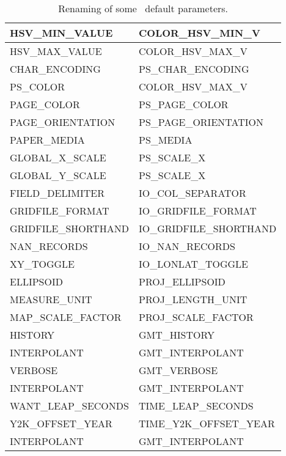 \begin{table}[H]
\begin{tabular}{|l|l|}
HSV\_MIN\_VALUE			&	COLOR\_HSV\_MIN\_V \\ \hline
HSV\_MAX\_VALUE			&	COLOR\_HSV\_MAX\_V \\ \hline
CHAR\_ENCODING			&	PS\_CHAR\_ENCODING \\ \hline
PS\_COLOR			&	COLOR\_HSV\_MAX\_V \\ \hline
PAGE\_COLOR			&	PS\_PAGE\_COLOR \\ \hline
PAGE\_ORIENTATION		&	PS\_PAGE\_ORIENTATION \\ \hline
PAPER\_MEDIA			&	PS\_MEDIA \\ \hline
GLOBAL\_X\_SCALE		&	PS\_SCALE\_X \\ \hline
GLOBAL\_Y\_SCALE		&	PS\_SCALE\_X \\ \hline
FIELD\_DELIMITER		&	IO\_COL\_SEPARATOR \\ \hline
GRIDFILE\_FORMAT		&	IO\_GRIDFILE\_FORMAT \\ \hline
GRIDFILE\_SHORTHAND		&	IO\_GRIDFILE\_SHORTHAND \\ \hline
NAN\_RECORDS			&	IO\_NAN\_RECORDS \\ \hline
XY\_TOGGLE			&	IO\_LONLAT\_TOGGLE \\ \hline
ELLIPSOID			&	PROJ\_ELLIPSOID \\ \hline
MEASURE\_UNIT			&	PROJ\_LENGTH\_UNIT \\ \hline
MAP\_SCALE\_FACTOR		&	PROJ\_SCALE\_FACTOR \\ \hline
HISTORY				&	GMT\_HISTORY \\ \hline
INTERPOLANT			&	GMT\_INTERPOLANT \\ \hline
VERBOSE				&	GMT\_VERBOSE \\ \hline
INTERPOLANT			&	GMT\_INTERPOLANT \\ \hline
WANT\_LEAP\_SECONDS		&	TIME\_LEAP\_SECONDS \\ \hline
Y2K\_OFFSET\_YEAR		&	TIME\_Y2K\_OFFSET\_YEAR \\ \hline
INTERPOLANT			&	GMT\_INTERPOLANT \\ \hline
\end{tabular}
\caption{Renaming of some \gmt\ default parameters.}
\label{tbl:obsoletedefs}
\end{table}
